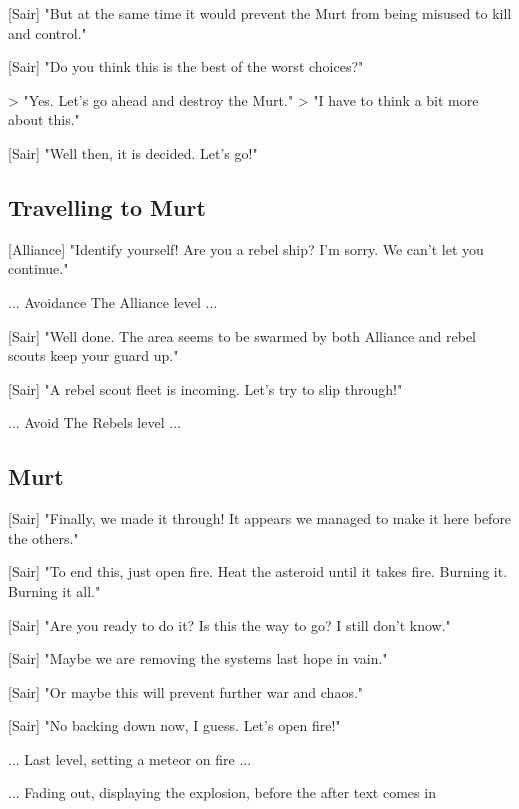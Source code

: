 \documentclass[a4paper,12pt]{article}
\begin{document}
[Sair] "But at the same time it would prevent the Murt from being misused to kill and control."

[Sair] "Do you think this is the best of the worst choices?"

> "Yes. Let's go ahead and destroy the Murt."
> "I have to think a bit more about this."

[Sair] "Well then, it is decided. Let's go!"

\subsection{Travelling to Murt}

[Alliance] "Identify yourself! Are you a rebel ship? I'm sorry. We can't let you continue."

... Avoidance The Alliance level ...

[Sair] "Well done. The area seems to be swarmed by both Alliance and rebel scouts keep your guard up."

[Sair] "A rebel scout fleet is incoming. Let's try to slip through!"

... Avoid The Rebels level ...

\subsection{Murt}

[Sair] "Finally, we made it through! It appears we managed to make it here before the others."

[Sair] "To end this, just open fire. Heat the asteroid until it takes fire. Burning it. Burning it all."

[Sair] "Are you ready to do it? Is this the way to go? I still don't know."

[Sair] "Maybe we are removing the systems last hope in vain."

[Sair] "Or maybe this will prevent further war and chaos."

[Sair] "No backing down now, I guess. Let's open fire!"

... Last level, setting a meteor on fire ...

... Fading out, displaying the explosion, before the after text comes in
\end{document}
